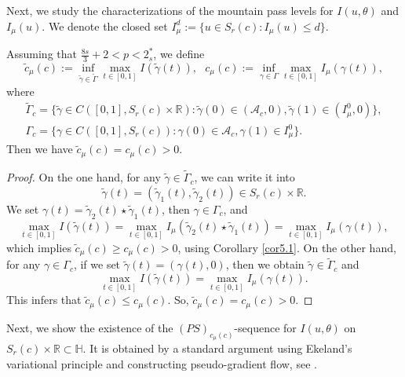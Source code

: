 Next, we study the characterizations of the mountain pass levels for 
$I(u,\theta)$ and $I_\mu(u)$. We denote the closed set
$I^d_\mu:=\{u\in  S_{r}(c):I_\mu(u)\leq d\}$.

\begin{proposition}\label{pro5.1} 
Assuming that  $\frac{8s}{3}+2<p< 2^*_s$,  we define
$$
\tilde{c}_\mu (c):=\inf_{\tilde{\gamma}\in \tilde{\Gamma}}\max_{t\in[0,1]}
I(\tilde{\gamma}(t)),~~~{c}_\mu (c):=\inf_{{\gamma}\in{\Gamma}}
\max_{t\in[0,1]}I_{\mu}({\gamma}(t)),
$$
where
\begin{gather*}
\tilde{\Gamma}_c=\{\tilde{\gamma}\in C([0,1],  S_{r}(c)\times \mathbb{R}): 
\tilde{\gamma}(0)\in (\mathcal{A}_c, 0), \tilde{\gamma}(1)\in (I^0_\mu, 0)\},\\
{\Gamma}_c=\{{\gamma}\in C([0,1],  S_{r}(c)): {\gamma}(0)\in \mathcal{A}_c,
 {\gamma}(1)\in I^0_\mu\}.
\end{gather*}
Then we have 
$\tilde{c}_\mu (c)={c}_\mu (c)>0$.
\end{proposition}

\begin{proof}
 On the one hand, for any $\tilde{\gamma}\in \tilde{\Gamma}_c$, we can write  it into 
$$
\tilde{\gamma}(t)=(\tilde{\gamma}_1(t), \tilde{\gamma}_2(t))\in S_r(c)\times \mathbb{R}.
$$
We set ${\gamma}(t)=\tilde{\gamma}_2(t)\star \tilde{\gamma}_1(t)$, then 
${\gamma}\in {\Gamma}_c$, and
$$
 \max_{t\in[0,1]} I(\tilde{\gamma}(t))=\max_{t\in[0,1]} I_\mu(\tilde{\gamma}_2(t)
 \star \tilde{\gamma}_1(t))=\max_{t\in[0,1] } I_\mu({\gamma}(t)),
$$
which implies $\tilde{c}_\mu (c)\geq {c}_\mu (c)>0$, using Corollary \ref{cor5.1}. 
On the other hand, for any ${\gamma}\in {\Gamma}_c$, if we set
$\tilde{\gamma}(t)= ({\gamma}(t), 0)$, then we obtain 
$\tilde{\gamma}\in \tilde{\Gamma}_c$ and
$$
\max_{t\in[0,1]} I(\tilde{\gamma}(t))
=\max_{t\in[0,1] } I_\mu({\gamma}(t)).
$$
This infers that  $\tilde{c}_\mu (c)\leq {c}_\mu (c)$. So,  
$\tilde{c}_\mu (c)= {c}_\mu (c)>0$.
\end{proof}

Next, we show the existence of the $(PS)_{{c}_\mu (c)}$-sequence for $I(u, \theta)$ 
on $ S_{r}(c)\times \mathbb{R}\subset \mathbb{H}$. 
It is obtained by a standard argument using Ekeland's variational principle and
constructing pseudo-gradient flow, see \cite[Proposition 2.2]{J7888}.

